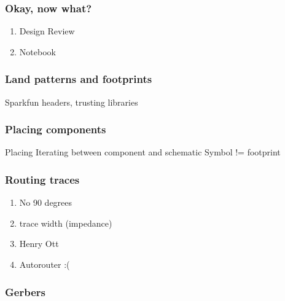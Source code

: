 \documentclass{beamer}
\begin{document}

\begin{frame}
\frametitle{Okay, now what?}
\begin{enumerate}
\item Design Review
\item Notebook
\end{enumerate}
\end{frame}


\begin{frame}
\frametitle{Land patterns and footprints}
Sparkfun headers, trusting libraries
\end{frame}


\begin{frame}
\frametitle{Placing components}
Placing
Iterating between component and schematic
Symbol != footprint
\end{frame}


\begin{frame}
\frametitle{Routing traces}
\begin{enumerate}
\item No 90 degrees
\item trace width (impedance)
\item Henry Ott
\item Autorouter :(
\end{enumerate}
\end{frame}


\begin{frame}
\frametitle{Gerbers}
\end{frame}

\end{document}
